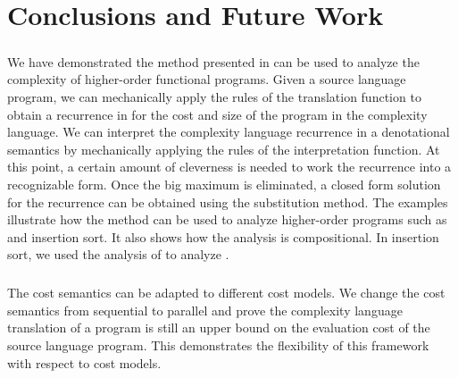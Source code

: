 \chapter{Conclusions and Future Work}

\paragraph{}
We have demonstrated the method presented in \citet{Danner2015} can be used to
analyze the complexity of higher-order functional programs. Given a source
language program, we can mechanically apply the rules of the translation
function to obtain a recurrence in for the cost and size of the program in the
complexity language. We can interpret the complexity language recurrence in a
denotational semantics by mechanically applying the rules of the interpretation
function. At this point, a certain amount of cleverness is needed to work the
recurrence into a recognizable form. Once the big maximum is eliminated, a
closed form solution for the recurrence can be obtained using the substitution
method. The examples illustrate how the method can be used to analyze
higher-order programs such as  and insertion sort. It also shows how the
analysis is compositional. In insertion sort, we used the analysis of
 to analyze .


\paragraph{}
The cost semantics can be adapted to different cost models. We change the cost
semantics from sequential to parallel and prove the complexity language
translation of a program is still an upper bound on the evaluation cost of the
source language program. This demonstrates the flexibility of this framework
with respect to cost models.

